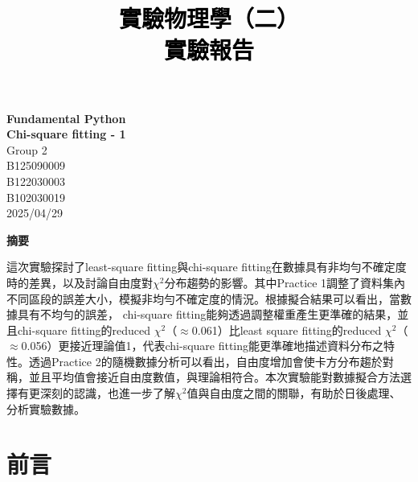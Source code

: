 \documentclass[12pt,a4paper]{article}
\title{\vspace{-0.5cm}
       {\bf \textcolor{black}{{\LARGE 
       \begin{CJK}{UTF8}{bkai}
       實驗物理學（二）\\
       \vspace{6pt}
        實驗報告\\
       \end{CJK}
       }}
       }
       }
\author{}
\date{}
\begin{document}
\begin{CJK}{UTF8}{bkai}

\maketitle
\thispagestyle{empty}

\vspace{10cm}
\begin{center}
{\bf \LARGE \vspace{-11cm} Fundamental Python\\
\vspace{0.25cm} Chi-square fitting - 1}\\
\vspace{13cm}
{\large Group 2}\\ \vspace{12pt}
{\large {} B125090009}\\ \vspace{6pt}
{\large {}  B122030003}\\ \vspace{6pt}
{\large {} B102030019}\\ \vspace{12pt}
{\large 2025/04/29}\\
\end{center}

\clearpage
\vspace{2cm}
\begin{center}
{\large\bf\sc 摘要}
\end{center}

這次實驗探討了least-square fitting與chi-square fitting在數據具有非均勻不確定度時的差異，以及討論自由度對$\chi^2$分布趨勢的影響。其中Practice 1調整了資料集內不同區段的誤差大小，模擬非均勻不確定度的情況。根據擬合結果可以看出，當數據具有不均勻的誤差， chi-square fitting能夠透過調整權重產生更準確的結果，並且chi-square fitting的reduced $\chi^2$（$\approx$0.061）比least square fitting的reduced $\chi^2$（$\approx$0.056）更接近理論值1，代表chi-square fitting能更準確地描述資料分布之特性。透過Practice 2的隨機數據分析可以看出，自由度增加會使卡方分布趨於對稱，並且平均值會接近自由度數值，與理論相符合。本次實驗能對數據擬合方法選擇有更深刻的認識，也進一步了解$\chi^2$值與自由度之間的關聯，有助於日後處理、分析實驗數據。


\section{前言}
\hfill


\end{CJK}
\end{document}
